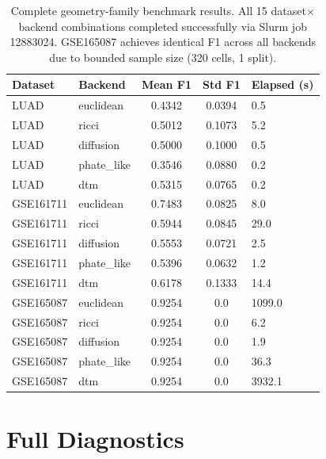 \documentclass[11pt]{article}
\begin{document}
\begin{table}[h]
\centering
\small
\begin{tabular}{llccl}
\toprule
Dataset & Backend & Mean F1 & Std F1 & Elapsed (s) \\
\midrule
LUAD & euclidean & 0.4342 & 0.0394 & 0.5 \\
LUAD & ricci & 0.5012 & 0.1073 & 5.2 \\
LUAD & diffusion & 0.5000 & 0.1000 & 0.5 \\
LUAD & phate\_like & 0.3546 & 0.0880 & 0.2 \\
LUAD & dtm & 0.5315 & 0.0765 & 0.2 \\
\midrule
GSE161711 & euclidean & 0.7483 & 0.0825 & 8.0 \\
GSE161711 & ricci & 0.5944 & 0.0845 & 29.0 \\
GSE161711 & diffusion & 0.5553 & 0.0721 & 2.5 \\
GSE161711 & phate\_like & 0.5396 & 0.0632 & 1.2 \\
GSE161711 & dtm & 0.6178 & 0.1333 & 14.4 \\
\midrule
GSE165087 & euclidean & 0.9254 & 0.0 & 1099.0 \\
GSE165087 & ricci & 0.9254 & 0.0 & 6.2 \\
GSE165087 & diffusion & 0.9254 & 0.0 & 1.9 \\
GSE165087 & phate\_like & 0.9254 & 0.0 & 36.3 \\
GSE165087 & dtm & 0.9254 & 0.0 & 3932.1 \\
\bottomrule
\end{tabular}
\caption{Complete geometry-family benchmark results.
All 15 dataset$\times$backend combinations completed successfully via Slurm job 12883024.
GSE165087 achieves identical F1 across all backends due to bounded sample size (320 cells, 1 split).}
\label{tab:benchmark_full}
\end{table}

\section{Full Diagnostics}
\label{sec:diagnostics}
\end{document}
